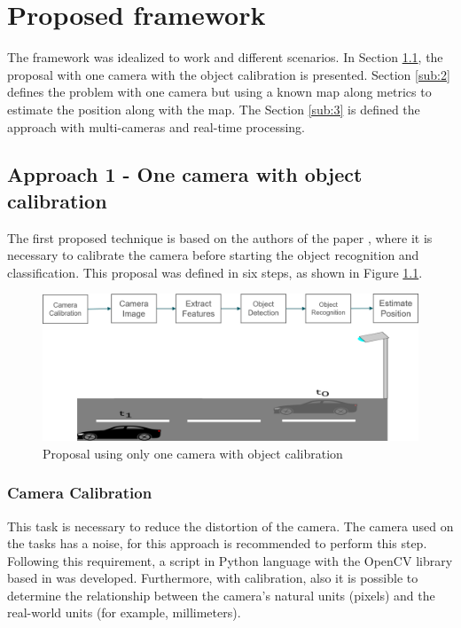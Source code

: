 
\chapter{Proposed framework}
\label{capitulo4}
The framework was idealized to work and different scenarios. In Section \ref{sub:1}, the proposal with one camera with the object calibration is presented. Section \ref{sub:2} defines the problem with one camera but using a known map along metrics to estimate the position along with the map. The Section \ref{sub:3} is defined the approach with multi-cameras and real-time processing. 



\section{Approach 1 - One camera with object calibration}\label{sub:1}

The first proposed technique is based on the authors of the paper \cite{8678911}, where it is necessary to calibrate the camera before starting the object recognition and classification. This proposal was defined in six steps, as shown in Figure \ref{fig:proposal1}.

\begin{figure}[H]
\centering
\includegraphics[width=\textwidth]{imagens/proposal1.png}
\caption{Proposal using only one camera with object calibration}
\label{fig:proposal1}
\end{figure}

\subsection{Camera Calibration}

This task is necessary to reduce the distortion of the camera. The camera used on the tasks has a noise, for this approach is recommended to perform this step. Following this requirement, a script in Python language with the OpenCV library based in \cite{zhu2020camera} was developed. Furthermore, with calibration, also it is possible to determine the relationship between the camera's natural units (pixels) and the real-world units (for example, millimeters).

